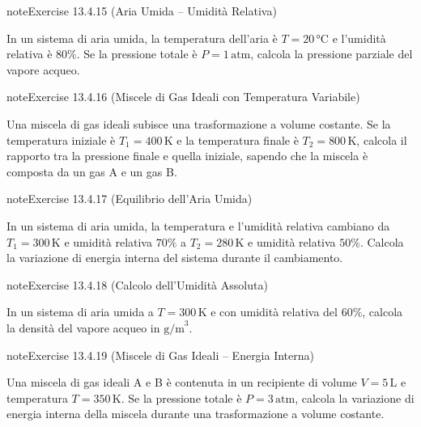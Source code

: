 \documentclass[letterpaper,10pt,italian]{jupyterBook}
\begin{document}
\begin{sphinxadmonition}{note}{Exercise 13.4.15 (Aria Umida – Umidità Relativa)}



\sphinxAtStartPar
In un sistema di aria umida, la temperatura dell’aria è \(T = 20 \, \text{°C}\) e l’umidità relativa è \(80\%\). Se la pressione totale è \(P = 1 \, \text{atm}\), calcola la pressione parziale del vapore acqueo.
\end{sphinxadmonition}
 \label{exercise:ch/thermodynamics/matter-problems-exercise-15}

\begin{sphinxadmonition}{note}{Exercise 13.4.16 (Miscele di Gas Ideali con Temperatura Variabile)}



\sphinxAtStartPar
Una miscela di gas ideali subisce una trasformazione a volume costante. Se la temperatura iniziale è \(T_1 = 400 \, \text{K}\) e la temperatura finale è \(T_2 = 800 \, \text{K}\), calcola il rapporto tra la pressione finale e quella iniziale, sapendo che la miscela è composta da un gas A e un gas B.
\end{sphinxadmonition}
 \label{exercise:ch/thermodynamics/matter-problems-exercise-16}

\begin{sphinxadmonition}{note}{Exercise 13.4.17 (Equilibrio dell’Aria Umida)}



\sphinxAtStartPar
In un sistema di aria umida, la temperatura e l’umidità relativa cambiano da \(T_1 = 300 \, \text{K}\) e umidità relativa \(70\%\) a \(T_2 = 280 \, \text{K}\) e umidità relativa \(50\%\). Calcola la variazione di energia interna del sistema durante il cambiamento.
\end{sphinxadmonition}
 \label{exercise:ch/thermodynamics/matter-problems-exercise-17}

\begin{sphinxadmonition}{note}{Exercise 13.4.18 (Calcolo dell’Umidità Assoluta)}



\sphinxAtStartPar
In un sistema di aria umida a \(T = 300 \, \text{K}\) e con umidità relativa del \(60\%\), calcola la densità del vapore acqueo in \( \text{g/m}^3\).
\end{sphinxadmonition}
 \label{exercise:ch/thermodynamics/matter-problems-exercise-18}

\begin{sphinxadmonition}{note}{Exercise 13.4.19 (Miscele di Gas Ideali – Energia Interna)}



\sphinxAtStartPar
Una miscela di gas ideali A e B è contenuta in un recipiente di volume \(V = 5 \, \text{L}\) e temperatura \(T = 350 \, \text{K}\). Se la pressione totale è \(P = 3 \, \text{atm}\), calcola la variazione di energia interna della miscela durante una trasformazione a volume costante.
\end{sphinxadmonition}
 \label{exercise:ch/thermodynamics/matter-problems-exercise-19}
\end{document}
